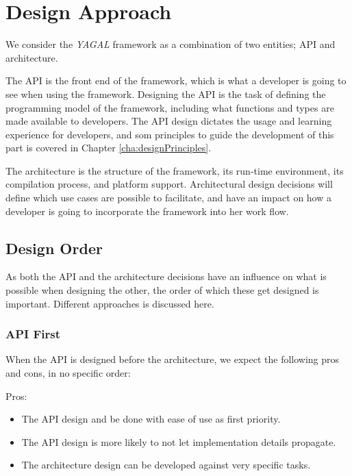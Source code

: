 \section{Design Approach}
We consider the \textit{YAGAL} framework as a combination of two entities; API and architecture.

The API is the front end of the framework, which is what a developer is going to see when using the framework. Designing the API is the task of defining the programming model of the framework, including what functions and types are made available to developers. The API design dictates the usage and learning experience for developers, and som principles to guide the development of this part is covered in Chapter \ref{cha:designPrinciples}.

The architecture is the structure of the framework, its run-time environment, its compilation process, and platform support. Architectural design decisions will define which use cases are possible to facilitate, and have an impact on how a developer is going to incorporate the framework into her work flow.

\subsection{Design Order}
As both the API and the architecture decisions have an influence on what is possible when designing the other, the order of which these get designed is important. Different approaches is discussed here.

\subsubsection{API First}
When the API is designed before the architecture, we expect the following pros and cons, in no specific order:

Pros:
\begin{itemize}
\item The API design and be done with ease of use as first priority.
\item The API design is more likely to not let implementation details propagate.
\item The architecture design can be developed against very specific tasks.
\end{itemize}

